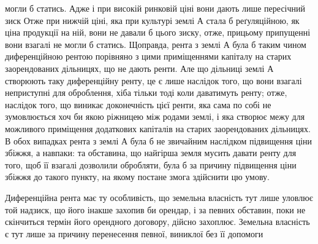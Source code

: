 могли б статись. Адже і при високій ринковій ціні вони дають лише пересічний
зиск Отже при нижчій ціні, яка при культурі землі $А$ стала б реґуляційною,
як ціна продукції на ній, вони не давали б цього зиску, отже, прицьому
припущенні вони взагалі не могли б статись. Щоправда, рента з землі
$А$ була б таким чином диференційною рентою порівняно з цими приміщеннями
капіталу на старих заорендованих дільницях, що не дають ренти. Але
що дільниці землі $А$ створюють таку диференційну ренту, це є лише наслідок
того, що вони взагалі неприступні для оброблення, хіба тільки тоді коли
даватимуть ренту; отже, наслідок того, що виникає доконечність цієї ренти, яка
сама по собі не зумовлюється хоч би якою ріжницею між родами землі, і яка
створює межу для можливого приміщення додаткових капіталів на старих заорендованих
дільницях. В обох випадках рента з землі $А$ була б не звичайним
наслідком підвищення ціни збіжжя, а навпаки: та обставина, що найгірша
земля мусить давати ренту для того, щоб її взагалі дозволили обробляти, була б
за причину підвищення ціни збіжжя до такого пункту, на якому постане змога
здійснити цю умову.

Диференційна рента має ту особливість, що земельна власність тут лише
уловлює той надзиск, що його інакше захопив би орендар, і за певних обставин,
поки не скінчиться термін його орендного договору, дійсно захоплює. Земельна
власність є тут лише за причину перенесення певної, виниклої без її допомоги
\parbreak{}  %
